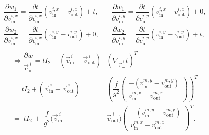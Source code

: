 \begin{proposition}
	\begin{align*}
		\dfrac{\partial w_1}{\partial v_{\text{in}}^{i, x}} = \dfrac{\partial t}{\partial v_{\text{in}}^{i, x}}(v_{\text{in}}^{i, x}- v_{\text{out}}^{i, x}) + t, &\quad 
		\dfrac{\partial w_1}{\partial v_{\text{in}}^{i, y}} = \dfrac{\partial t}{\partial v_{\text{in}}^{i, y}}(v_{\text{in}}^{i, x}- v_{\text{out}}^{i, x}) + 0, \\[0.5em]
		\dfrac{\partial w_2}{\partial v_{\text{in}}^{i, x}} = \dfrac{\partial t}{\partial v_{\text{in}}^{i, x}}(v_{\text{in}}^{i, y}- v_{\text{out}}^{i, y}) + 0, &\quad 
		\dfrac{\partial w_2}{\partial v_{\text{in}}^{i, y}} = \dfrac{\partial t}{\partial v_{\text{in}}^{i, y}}(v_{\text{in}}^{i, y}- v_{\text{out}}^{i, y}) + t, \\[0.5em]
	\end{align*}
	\begin{align*}
		\Rightarrow \dfrac{\partial w}{\vec{v}_{\text{in}}^{\: i}} = t I_2 + (\vec{v}_{\text{in}}^{\: i} - \vec{v}_{\text{out}}^{\: i}) &(\nabla_{\vec{v}_{\text{in}}^{\: i}} t)^T \\[0.5em]
		= t I_2 + (\vec{v}_{\text{in}}^{\: i} - \vec{v}_{\text{out}}^{\: i}) &\left(\dfrac{f}{g^2} \begin{pmatrix}
			-(v_{\text{in}}^{m, y} - v_{\text{out}}^{m, y}) \\[0.5em]
			v_{\text{in}}^{m, x} - v_{\text{out}}^{m, x}
		\end{pmatrix}\right)^T \\[0.5em]
		= \; t I_2 \:+\: \dfrac{f}{g^2}(\vec{v}_{\text{in}}^{\: i} \;-\; &\vec{v}_{\text{out}}^{\: i}) \begin{pmatrix}
			-(v_{\text{in}}^{m, y} - v_{\text{out}}^{m, y}) \\[0.5em]
			 v_{\text{in}}^{m, x} - v_{\text{out}}^{m, x}
		\end{pmatrix}^T. \\[0.5em]
	\end{align*}

	
\end{proposition}

